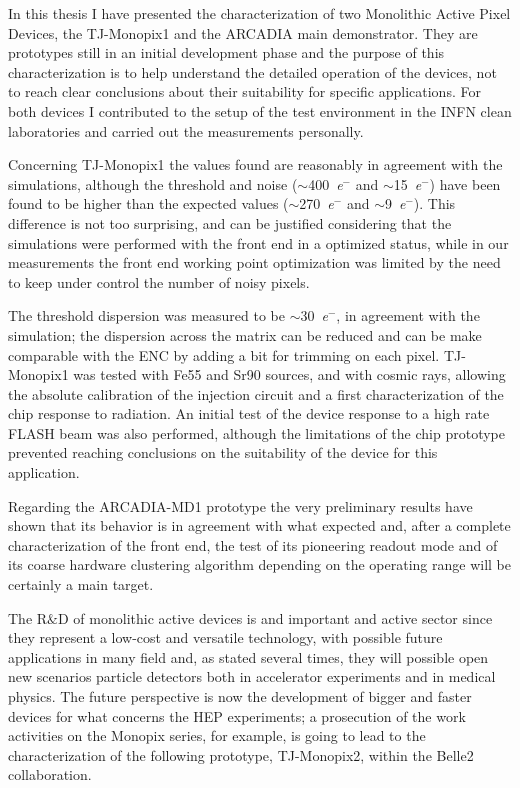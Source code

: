In this thesis I have presented the characterization of two Monolithic Active Pixel Devices, the TJ-Monopix1 and the ARCADIA main demonstrator.
They are prototypes still in an initial development phase and the purpose of this characterization is to help understand the detailed operation of the devices, not to reach clear conclusions about their suitability for specific applications.
For both devices I contributed to the setup of the test environment in the INFN clean laboratories and carried out the measurements personally.

Concerning TJ-Monopix1 the values found are reasonably in agreement with the simulations, although the threshold and noise ($\sim$\SI{400}{\elementarycharge}$^-$ and $\sim$\SI{15}{\elementarycharge}$^-$) have been found to be higher than the expected values ($\sim$\SI{270}{\elementarycharge}$^-$ and $\sim$\SI{9}{\elementarycharge}$^-$).
This difference is not too surprising,  and can be justified considering that the simulations were performed with the front end in a optimized status, while in our measurements the front end working point optimization was limited by the need to keep under control the number of noisy pixels.

The threshold dispersion was measured to be $\sim$\SI{30}{\elementarycharge}$^-$, in agreement with the simulation; the dispersion across the matrix can be reduced and can be make comparable with the ENC by adding a bit for trimming on each pixel.
TJ-Monopix1 was tested with Fe55 and Sr90 sources, and with cosmic rays, allowing the absolute calibration of the injection circuit and a first characterization of the chip response to radiation.
An initial test of the device response to a high rate FLASH beam was also performed, although the limitations of the chip prototype prevented reaching conclusions on the suitability of the device for this application.


Regarding the ARCADIA-MD1 prototype the very preliminary results have shown that its behavior is in agreement with what expected and, after a complete characterization of the front end, the test of its pioneering readout mode and of its coarse hardware clustering algorithm depending on the operating range will be certainly a main target.

The R$\&$D of monolithic active devices is and important and active sector since they represent a low-cost and versatile technology, with possible future applications in many field and, as stated several times, they will possible open new scenarios particle detectors both in accelerator experiments and in medical physics.
The future perspective is now the development of bigger and faster devices for what concerns the HEP experiments; a prosecution of the work activities on the Monopix series, for example, is going to lead to the characterization of the following prototype, TJ-Monopix2, within the Belle2 collaboration. 

